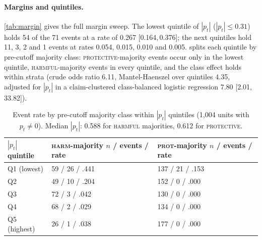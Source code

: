 \documentclass[11pt]{article}
\newcommand{\ci}[2]{[#1,\,#2]}
\begin{document}
\paragraph{Margins and quintiles.} \cref{tab:margin} gives the full margin sweep. The lowest
quintile of $|p_t|$ ($|p_t|\le0.31$) holds 54 of the 71 events at a rate of 0.267 \ci{0.164}{0.376};
the next quintiles hold 11, 3, 2 and 1 events at rates 0.054, 0.015, 0.010 and 0.005.
 splits each quintile by pre-cutoff majority class: \textsc{protective}-majority
events occur only in the lowest quintile, \textsc{harmful}-majority events in every quintile, and the
class effect holds within strata (crude odds ratio 6.11, Mantel-Haenszel over quintiles 4.35,
adjusted for $|p_t|$ in a claim-clustered class-balanced logistic regression 7.80 \ci{2.01}{33.82}).

\begin{table}[!t]\centering\scriptsize
\setlength{\tabcolsep}{4pt}
\begin{tabular}{@{}lll@{}}
\toprule
$|p_t|$ quintile & \textsc{harm}-majority $n$ / events / rate & \textsc{prot}-majority $n$ / events / rate \\
\midrule
Q1 (lowest) & 59 / 26 / .441 & 137 / 21 / .153 \\
Q2 & 49 / 10 / .204 & 152 / 0 / .000 \\
Q3 & 72 / 3 / .042 & 130 / 0 / .000 \\
Q4 & 68 / 2 / .029 & 134 / 0 / .000 \\
Q5 (highest) & 26 / 1 / .038 & 177 / 0 / .000 \\
\bottomrule
\end{tabular}
\caption{Event rate by pre-cutoff majority class within $|p_t|$ quintiles (1{,}004 units with
$p_t\neq0$). Median $|p_t|$: 0.588 for \textsc{harmful} majorities, 0.612 for \textsc{protective}.}
\label{tab:classquint}
\end{table}
\end{document}

